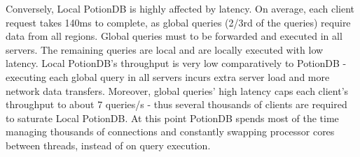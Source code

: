 \documentclass[sigplan,review,anonymous]{acmart}
\begin{document}
Conversely, Local PotionDB is highly affected by latency.
On average, each client request takes 140ms to complete, as global queries (2/3rd of the queries) require data from all regions.
Global queries must to be forwarded and executed in all servers.
The remaining queries are local and are locally executed with low latency.
Local PotionDB's throughput is very low comparatively to PotionDB - executing each global query in all servers incurs extra server load and more network data transfers.
Moreover, global queries' high latency caps each client's throughput to about 7 queries/s - thus several thousands of clients are required to saturate Local PotionDB.
At this point PotionDB spends most of the time managing thousands of connections and constantly swapping processor cores between threads, instead of on query execution.
\end{document}
